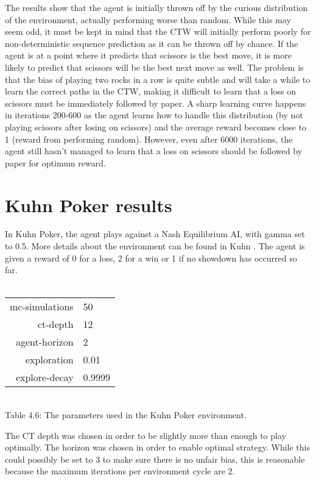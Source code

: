 \documentclass[pdftex,twoside,a4paper]{report}
\begin{document}
The results show that the agent is initially thrown off by the curious distribution of the environment, actually performing worse than random. While this may seem odd, it must be kept in mind that the CTW will initially perform poorly for non-deterministic sequence prediction as it can be thrown off by chance. If the agent is at a point where it predicts that scissors is the best move, it is more likely to predict that scissors will be the best next move as well. The problem is that the bias of playing two rocks in a row is quite subtle and will take a while to learn the correct paths in the CTW, making it difficult to learn that a loss on scissors must be immediately followed by paper. A sharp learning curve happens in iterations 200-600 as the agent learns how to handle this distribution (by not playing scissors after losing on scissors) and the average reward becomes close to 1 (reward from performing random). However, even after 6000 iterations, the agent still hasn't managed to learn that a loss on scissors should be followed by paper for optimum reward.

\section{Kuhn Poker results}
In Kuhn Poker, the agent plays against a Nash Equilibrium AI, with gamma set to 0.5. More details about the environment can be found in Kuhn \cite{kuhn}. The agent is given a reward of 0 for a loss, 2 for a win or 1 if no showdown has occurred so far.\\\\
\begin{center}
\begin{tabular}{| r | l | }
\hline
mc-simulations & 50\\
ct-depth & 12\\
agent-horizon & 2\\
exploration & 0.01\\
explore-decay & 0.9999\\
\hline
\end{tabular}\\
\vspace{0.5mm}
Table 4.6: The parameters used in the Kuhn Poker environment.
\end{center}
The CT depth was chosen in order to be slightly more than enough to play optimally. The horizon was chosen in order to enable optimal strategy. While this could possibly be set to 3 to make sure there is no unfair bias, this is reasonable because the maximum iterations per environment cycle are 2.
\end{document}
